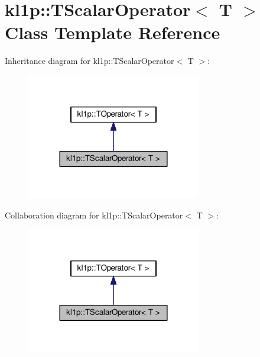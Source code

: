 \hypertarget{classkl1p_1_1TScalarOperator}{}\section{kl1p\+:\+:T\+Scalar\+Operator$<$ T $>$ Class Template Reference}
\label{classkl1p_1_1TScalarOperator}


Inheritance diagram for kl1p\+:\+:T\+Scalar\+Operator$<$ T $>$\+:
\nopagebreak
\begin{figure}[H]
\begin{center}
\leavevmode
\includegraphics[width=216pt]{classkl1p_1_1TScalarOperator__inherit__graph}
\end{center}
\end{figure}


Collaboration diagram for kl1p\+:\+:T\+Scalar\+Operator$<$ T $>$\+:
\nopagebreak
\begin{figure}[H]
\begin{center}
\leavevmode
\includegraphics[width=216pt]{classkl1p_1_1TScalarOperator__coll__graph}
\end{center}
\end{figure}
